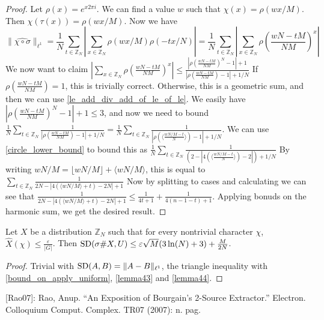 \begin{proof}
    \leanok
    Let $\rho(x) = e^{x 2\pi i}$. We can find a value $w$ such that $\chi(x) = \rho(w x / M)$. Then $\chi(\tau(x)) = \rho(w x / M)$.
    Now we have
    $$\lVert \widehat{\chi \circ \sigma}\rVert_{\ell^1} = \frac{1}{N} \sum_{t \in \mathbb{Z}_N} |\sum_{x \in \mathbb{Z}_N} \rho(w x / M) \rho(- tx/N)| =
    \frac{1}{N} \sum_{t \in \mathbb{Z}_N} |\sum_{x \in \mathbb{Z}_N} \rho(\frac{w N - t M}{N M})^x|$$
    We now want to claim $|\sum_{x \in \mathbb{Z}_N} \rho(\frac{w N - t M}{N M})^x| \leq
        \frac{|\rho(\frac{w N - t M}{N M})^N - 1| + 1}{|\rho(\frac{w N - t M}{N M}) - 1| + 1/N}$
    If $\rho(\frac{w N - t M}{N M}) = 1$, this is trivially correct. Otherwise, this is a geometric sum, and then we can use
    \ref{le_add_div_add_of_le_of_le}.
    We easily have $|\rho(\frac{w N - t M}{N M})^N - 1| + 1 \leq 3$, and now we need to bound
    $\frac1N\sum_{t \in \mathbb{Z}_N} \frac1{|\rho(\frac{w N - t M}{N M}) - 1| + 1/N} = \frac1N\sum_{t \in \mathbb{Z}_N} \frac1{|\rho(\langle\frac{w N / M - t}{N}\rangle) - 1| + 1/N}$.
    We can use \ref{circle_lower_bound} to bound this as $\frac1N\sum_{t \in \mathbb{Z}_N} \frac1{(2 - |4(\langle\frac{w N / M - t}{N}\rangle) - 2|) + 1/N}$
    By writing $w N / M = \lfloor w N / M \rfloor + \langle w N / M \rangle$, this is equal to
    $\sum_{t \in \mathbb{Z}_N} \frac1{2N - |4(\langle{w N / M}\rangle + t) - 2N| + 1}$
    Now by splitting to cases and calculating we can see that $\frac1{2N - |4(\langle{w N / M}\rangle + t) - 2N| + 1} \leq \frac1{4t+1} + \frac1{4(n-1-t)+1}$.
    Applying bonuds on the harmonic sum, we get the desired result.
\end{proof}

\begin{theorem}
    \label{generalized_XOR_lemma}
    \leanok
    Let $X$ be a distribution $\mathbb{Z}_N$ such that for every nontrivial character $\chi$,
    $\hat{X}(\chi) \leq \frac{\varepsilon}{|G|}$. Then $\operatorname{\operatorname{SD}}(\sigma \# X, U) \leq \varepsilon \sqrt{M} (3\ln(N) + 3) + \frac{M}{2N}$.
\end{theorem}

\begin{proof}
    \leanok
    Trivial with $\operatorname{\operatorname{SD}}(A, B) = \lVert A - B \rVert_{\ell^1}$, the triangle inequality with \ref{bound_on_apply_uniform}, \ref{lemma43} and \ref{lemma44}.
\end{proof}

[Rao07]: Rao, Anup. “An Exposition of Bourgain's 2-Source Extractor.” Electron. Colloquium Comput. Complex. TR07 (2007): n. pag.